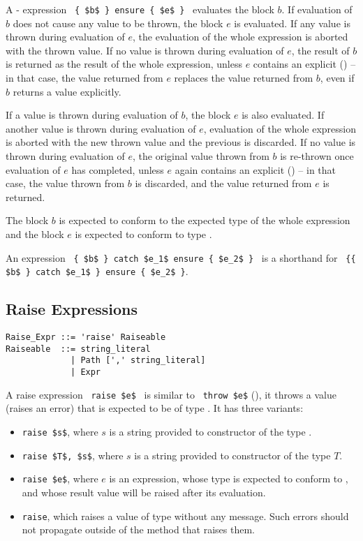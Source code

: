 A - expression ~\lstinline!{ $b$ } ensure { $e$ }!~ evaluates the block $b$. If evaluation of $b$ does not cause any value to be thrown, the block $e$ is evaluated. If any value is thrown during evaluation of $e$, the evaluation of the whole expression is aborted with the thrown value. If no value is thrown during evaluation of $e$, the result of $b$ is returned as the result of the whole expression, unless $e$ contains an explicit  () -- in that case, the value returned from $e$ replaces the value returned from $b$, even if $b$ returns a value explicitly. 

If a value is thrown during evaluation of $b$, the  block $e$ is also evaluated. If another value is thrown during evaluation of $e$, evaluation of the whole expression is aborted with the new thrown value and the previous is discarded. If no value is thrown during evaluation of $e$, the original value thrown from $b$ is re-thrown once evaluation of $e$ has completed, unless $e$ again contains an explicit  () -- in that case, the value thrown from $b$ is discarded, and the value returned from $e$ is returned. 


The block $b$ is expected to conform to the expected type of the whole expression and the  block $e$ is expected to conform to type . 

An expression ~\lstinline!{ $b$ } catch $e_1$ ensure { $e_2$ }!~ is a shorthand for ~\lstinline!{{ $b$ } catch $e_1$ } ensure { $e_2$ }!. 





\subsection{Raise Expressions}

\syntax\begin{lstlisting}
Raise_Expr ::= 'raise' Raiseable
Raiseable  ::= string_literal
             | Path [',' string_literal]
             | Expr
\end{lstlisting}

A raise expression ~\lstinline!raise $e$!~ is similar to ~\lstinline!throw $e$! (), it throws a value (raises an error) that is expected to be of type . It has three variants: 
\begin{itemize}
\item[] \lstinline!raise $s$!, where $s$ is a string provided to constructor of the type . 
\item[] \lstinline!raise $T$, $s$!, where $s$ is a string provided to constructor of the type $T$. 
\item[] \lstinline!raise $e$!, where $e$ is an expression, whose type is expected to conform to , and whose result value will be raised after its evaluation. 
\item[] \lstinline!raise!, which raises a value of type  without any message. Such errors should not propagate outside of the method that raises them. 
\end{itemize}

